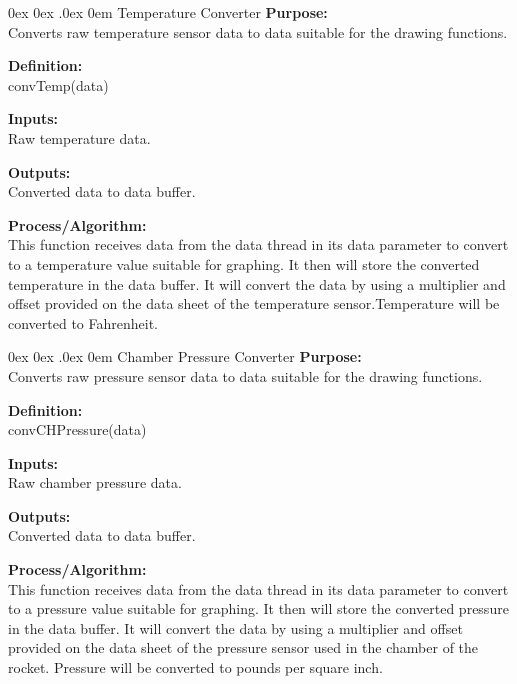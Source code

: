 \documentclass[10pt,draftclsnofoot,onecolumn,compsoc]{IEEEtran}
\makeatletter
\renewcommand\paragraph{\@startsection{paragraph}{4}{\z@}%
                                    {0ex \@plus0ex \@minus.0ex}%
                                    {0em}%
                                    {\normalfont\normalsize\bfseries}}
\makeatother
\begin{document}
\paragraph{Temperature Converter}
{\bf Purpose:} \\
Converts raw temperature sensor data to data suitable for the drawing functions.  \par
{\bf Definition:} \\ 
convTemp(data) \par
{\bf Inputs:} \\ Raw temperature data. \par
{\bf Outputs:} \\ Converted data to data buffer. \par
{\bf Process/Algorithm:} \\
This function receives data from the data thread in its data parameter to convert to a temperature value suitable for graphing. It then will store the converted temperature in the data buffer. It will convert the data by using a multiplier and offset provided on the data sheet of the temperature sensor.Temperature will be converted to Fahrenheit. \par

\paragraph{Chamber Pressure Converter}
{\bf Purpose:} \\
Converts raw pressure sensor data to data suitable for the drawing functions.  \par
{\bf Definition:} \\ 
convCHPressure(data) \par
{\bf Inputs:} \\ Raw chamber pressure data. \par
{\bf Outputs:} \\ Converted data to data buffer. \par
{\bf Process/Algorithm:} \\
This function receives data from the data thread in its data parameter to convert to a pressure value suitable for graphing. It then will store the converted pressure in the data buffer. It will convert the data by using a multiplier and offset provided on the data sheet of the pressure sensor used in the chamber of the rocket. Pressure will be converted to pounds per square inch. \par
\end{document}
